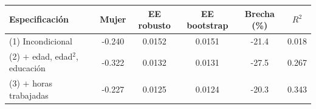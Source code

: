 
\begin{tabular}[t]{lccccc}
\toprule
Especificación & Mujer & EE robusto & EE bootstrap & Brecha (\%) & $R^2$\\
\midrule
(1) Incondicional & -0.240 & 0.0152 & 0.0151 & -21.4 & 0.018\\
(2) $+$ edad, edad$^2$, educación & -0.322 & 0.0132 & 0.0131 & -27.5 & 0.267\\
(3) $+$ horas trabajadas & -0.227 & 0.0125 & 0.0124 & -20.3 & 0.343\\
\bottomrule
\end{tabular}
